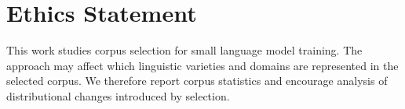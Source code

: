 \section{Ethics Statement}

This work studies corpus selection for small language model training. The approach may affect which linguistic varieties and domains are represented in the selected corpus. We therefore report corpus statistics and encourage analysis of distributional changes introduced by selection.
